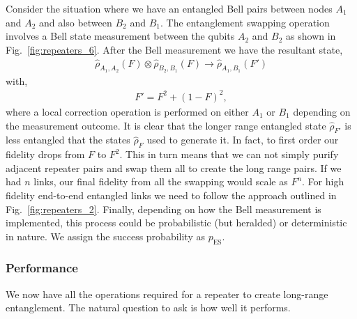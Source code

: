 Consider the situation where we have an entangled Bell pairs between nodes $A_1$ and $A_2$ and also between $B_2$ and $B_1$. The entanglement swapping operation involves a Bell state measurement between the qubits $A_2$ and $B_2$ as shown in Fig.~\ref{fig:repeaters_6}. After the Bell measurement we have the resultant state, 
\begin{align}
\hat\rho_{A_1,A_2} (F)\otimes \hat\rho_{B_2,B_1}(F)\rightarrow \hat\rho_{A_1,B_1} (F')
\end{align}
with,
\begin{align}
	F'=F^2+(1-F)^2,
\end{align}
where a local correction operation is performed on either $A_1$ or $B_1$ depending on the measurement outcome. It is clear that the longer range entangled state $\hat\rho_{F'}$ is less entangled that the states $\hat\rho_F$ used to generate it. In fact, to first order our fidelity drops from $F$ to $F^2$. This in turn means that we can not simply purify adjacent repeater pairs and swap them all to create the long range pairs. If we had $n$ links, our final fidelity from all the swapping would scale as $F^n$. For high fidelity end-to-end entangled links we need to follow the approach outlined in Fig.~\ref{fig:repeaters_2}. Finally, depending on how the Bell measurement is implemented, this process could be probabilistic (but heralded) or deterministic in nature. We assign the success probability as $p_\mathrm{ES}$.

\subsubsection{Performance}

We now have all the operations required for a repeater to create long-range entanglement. The natural question to ask is how well it performs.

